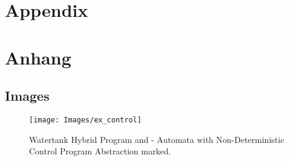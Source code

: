

{\chapter{Appendix}}    %
{\chapter{Anhang}}      %
\label{chap:appendix}


\section{Images}
	\setcounter{figure}{0}
	\begin{figure}
		\centering
		\texttt{[image: Images/ex\_control]}
		\caption{Watertank Hybrid Program and - Automata with Non-Deterministic Control Program Abstraction marked.}
		\label{fig:ex_control}
	\end{figure}

